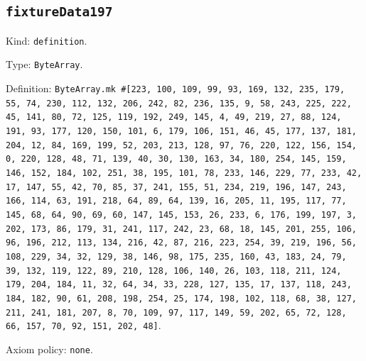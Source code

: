 \documentclass[11pt]{article}
\begin{document}
\subsection*{\texttt{fixtureData197}}
\noindent Kind: \texttt{definition}.\par
\noindent Type: \texttt{ByteArray}.\par
\noindent Definition: \texttt{ByteArray.mk \#[223, 100, 109, 99, 93, 169, 132, 235, 179, 55, 74, 230, 112, 132, 206, 242, 82, 236, 135, 9, 58, 243, 225, 222, 45, 141, 80, 72, 125, 119, 192, 249, 145, 4, 49, 219, 27, 88, 124, 191, 93, 177, 120, 150, 101, 6, 179, 106, 151, 46, 45, 177, 137, 181, 204, 12, 84, 169, 199, 52, 203, 213, 128, 97, 76, 220, 122, 156, 154, 0, 220, 128, 48, 71, 139, 40, 30, 130, 163, 34, 180, 254, 145, 159, 146, 152, 184, 102, 251, 38, 195, 101, 78, 233, 146, 229, 77, 233, 42, 17, 147, 55, 42, 70, 85, 37, 241, 155, 51, 234, 219, 196, 147, 243, 166, 114, 63, 191, 218, 64, 89, 64, 139, 16, 205, 11, 195, 117, 77, 145, 68, 64, 90, 69, 60, 147, 145, 153, 26, 233, 6, 176, 199, 197, 3, 202, 173, 86, 179, 31, 241, 117, 242, 23, 68, 18, 145, 201, 255, 106, 96, 196, 212, 113, 134, 216, 42, 87, 216, 223, 254, 39, 219, 196, 56, 108, 229, 34, 32, 129, 38, 146, 98, 175, 235, 160, 43, 183, 24, 79, 39, 132, 119, 122, 89, 210, 128, 106, 140, 26, 103, 118, 211, 124, 179, 204, 184, 11, 32, 64, 34, 33, 228, 127, 135, 17, 137, 118, 243, 184, 182, 90, 61, 208, 198, 254, 25, 174, 198, 102, 118, 68, 38, 127, 211, 241, 181, 207, 8, 70, 109, 97, 117, 149, 59, 202, 65, 72, 128, 66, 157, 70, 92, 151, 202, 48]}.\par
\noindent Axiom policy: \texttt{none}.\par
\end{document}
